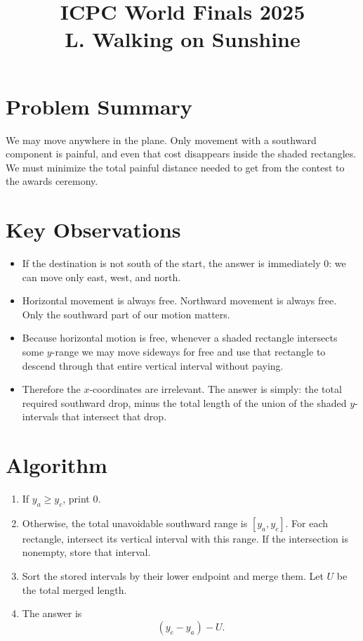 \documentclass[11pt]{article}
\title{ICPC World Finals 2025\\L. Walking on Sunshine}
\author{}
\date{}
\begin{document}
\maketitle

\section*{Problem Summary}

We may move anywhere in the plane. Only movement with a southward component is painful, and even that
cost disappears inside the shaded rectangles. We must minimize the total painful distance needed to get
from the contest to the awards ceremony.

\section*{Key Observations}

\begin{itemize}[leftmargin=*]
    \item If the destination is not south of the start, the answer is immediately $0$: we can move only east,
    west, and north.
    \item Horizontal movement is always free. Northward movement is always free. Only the southward part
    of our motion matters.
    \item Because horizontal motion is free, whenever a shaded rectangle intersects some $y$-range we may
    move sideways for free and use that rectangle to descend through that entire vertical interval without
    paying.
    \item Therefore the $x$-coordinates are irrelevant. The answer is simply:
    the total required southward drop, minus the total length of the union of the shaded $y$-intervals that
    intersect that drop.
\end{itemize}

\section*{Algorithm}

\begin{enumerate}[leftmargin=*]
    \item If $y_a \ge y_c$, print $0$.
    \item Otherwise, the total unavoidable southward range is $[y_a,y_c]$.
    For each rectangle, intersect its vertical interval with this range.
    If the intersection is nonempty, store that interval.
    \item Sort the stored intervals by their lower endpoint and merge them.
    Let $U$ be the total merged length.
    \item The answer is
    \[
    (y_c-y_a)-U.
    \]
\end{enumerate}
\end{document}
